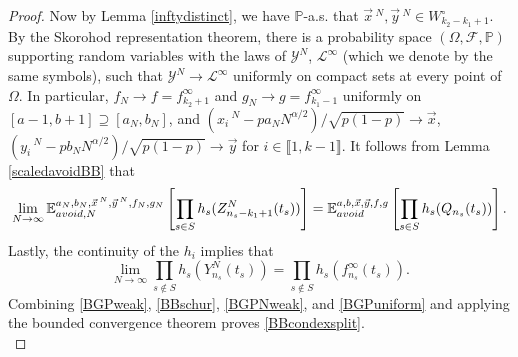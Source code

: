 \begin{proof}
	Now by Lemma \ref{inftydistinct}, we have $\mathbb{P}$-a.s. that $\vec{x}\,^N,\vec{y}\,^N\in W_{k_2-k_1+1}^\circ$. By the Skorohod representation theorem, there is a probability space $(\Omega,\mathcal{F},\mathbb{P})$ supporting random variables with the laws of $\mathcal{Y}^N$, $\mathcal{L}^\infty$ (which we denote by the same symbols), such that $\mathcal{Y}^N \to \mathcal{L}^\infty$ uniformly on compact sets at every point of $\Omega$. In particular, $f_N\to f = f^\infty_{k_2+1}$ and $g_N\to g = f^\infty_{k_1-1}$ uniformly on $[a-1,b+1]\supseteq [a_N,b_N]$, and $(x_i\,^N - pa_N N^{\alpha/2})/\sqrt{p(1-p)}\to\vec{x}$, $(y_i\,^N-pb_N N^{\alpha/2})/\sqrt{p(1-p)}\to\vec{y}$ for $i\in\llbracket 1,k-1\rrbracket$. It follows from Lemma \ref{scaledavoidBB} that 
	\begin{equation}\label{BGPNweak}
		\lim_{N\to\infty} \mathbb{E}^{a_N,b_N,\vec{x}\,^N,\vec{y}\,^N,f_N,g_N}_{avoid,N}\left[\prod_{s\in S} h_s(Z^N_{n_s-k_1+1}(t_s))\right] = \mathbb{E}^{a,b,\vec{x},\vec{y},f,g}_{avoid}\left[\prod_{s\in S} h_s(Q_{n_s}(t_s))\right].
	\end{equation}
	Lastly, the continuity of the $h_i$ implies that
	\begin{equation}\label{BGPuniform}
		\lim_{N\to\infty}\prod_{s\notin S} h_s(Y_{n_s}^N(t_s)) = \prod_{s\notin S} h_s(f^\infty_{n_s}(t_s)).
	\end{equation}
	Combining \eqref{BGPweak}, \eqref{BBschur}, \eqref{BGPNweak}, and \eqref{BGPuniform} and applying the bounded convergence theorem proves \eqref{BBcondexsplit}.\\
	

\end{proof}
